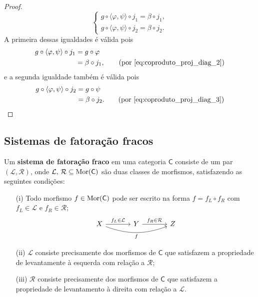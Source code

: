 \begin{proof}
  \begin{displaymath}
    \begin{cases}
      g \circ \langle \varphi,\psi \rangle \circ j_1 = \beta \circ j_1, \\
      g \circ \langle \varphi,\psi \rangle \circ j_2 = \beta \circ j_2.
    \end{cases}
  \end{displaymath}
  A primeira dessas igualdades é válida pois
  \begin{align*}
    g \circ \langle \varphi,\psi \rangle \circ j_1
    & = g \circ \varphi \\
    & = \beta \circ j_1,
    \tag{por \eqref{eq:coproduto_proj_diag_2}}
  \end{align*}
  e a segunda igualdade também é válida pois
  \begin{align*}
    g \circ \langle \varphi,\psi \rangle \circ j_2
    & = g \circ \psi \\
    & = \beta \circ j_2.
    \tag{por \eqref{eq:coproduto_proj_diag_3}}
  \end{align*}
\end{proof}

\subsection{Sistemas de fatoração fracos}

\begin{defin}
  Um \textbf{sistema de fatoração fraco} em uma categoria $\mathsf{C}$ consiste de um par $(\mathcal{L},\mathcal{R})$, onde $\mathcal{L},\, \mathcal{R} \subseteq \mathrm{Mor}(\mathsf{C})$ são duas classes de morfismos, satisfazendo as seguintes condições:
  \begin{enumerate}
  \item[(i)] Todo morfismo $f \in \mathrm{Mor}(\mathsf{C})$ pode ser escrito na forma $f = f_{L} \circ f_{R}$ com $f_{L} \in \mathcal{L}$ e $f_{R} \in \mathcal{R}$;
    \begin{displaymath}
      \begin{tikzcd}[column sep=1.25cm]
        X
        \arrow[r, "f_{L} \in \mathcal{L}"]
        \arrow[rr, bend right=20, "f" swap]
        & Y
        \arrow[r, "f_{R} \in \mathcal{R}"]
        & Z
      \end{tikzcd}
    \end{displaymath}
    
  \item[(ii)] $\mathcal{L}$ consiste precisamente dos morfismos de $\mathsf{C}$ que satisfazem a propriedade de levantamente à esquerda com relação a $\mathcal{R}$;
    
  \item[(iii)] $\mathcal{R}$ consiste precisamente dos morfismos de $\mathsf{C}$ que satisfazem a propriedade de levantamento à direita com relação a $\mathcal{L}$.
  \end{enumerate}
\end{defin}

